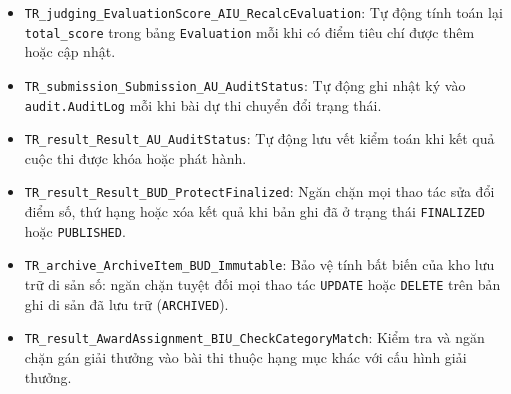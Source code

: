 \begin{enumerate}
\begin{itemize}
        \item \texttt{TR\_judging\_EvaluationScore\_AIU\_RecalcEvaluation}: Tự động tính toán lại \texttt{total\_score} trong bảng \texttt{Evaluation} mỗi khi có điểm tiêu chí được thêm hoặc cập nhật.
        \item \texttt{TR\_submission\_Submission\_AU\_AuditStatus}: Tự động ghi nhật ký vào \texttt{audit.AuditLog} mỗi khi bài dự thi chuyển đổi trạng thái.
        \item \texttt{TR\_result\_Result\_AU\_AuditStatus}: Tự động lưu vết kiểm toán khi kết quả cuộc thi được khóa hoặc phát hành.
        \item \texttt{TR\_result\_Result\_BUD\_ProtectFinalized}: Ngăn chặn mọi thao tác sửa đổi điểm số, thứ hạng hoặc xóa kết quả khi bản ghi đã ở trạng thái \texttt{FINALIZED} hoặc \texttt{PUBLISHED}.
        \item \texttt{TR\_archive\_ArchiveItem\_BUD\_Immutable}: Bảo vệ tính bất biến của kho lưu trữ di sản số: ngăn chặn tuyệt đối mọi thao tác \texttt{UPDATE} hoặc \texttt{DELETE} trên bản ghi di sản đã lưu trữ (\texttt{ARCHIVED}).
        \item \texttt{TR\_result\_AwardAssignment\_BIU\_CheckCategoryMatch}: Kiểm tra và ngăn chặn gán giải thưởng vào bài thi thuộc hạng mục khác với cấu hình giải thưởng.
    \end{itemize}
\end{enumerate}